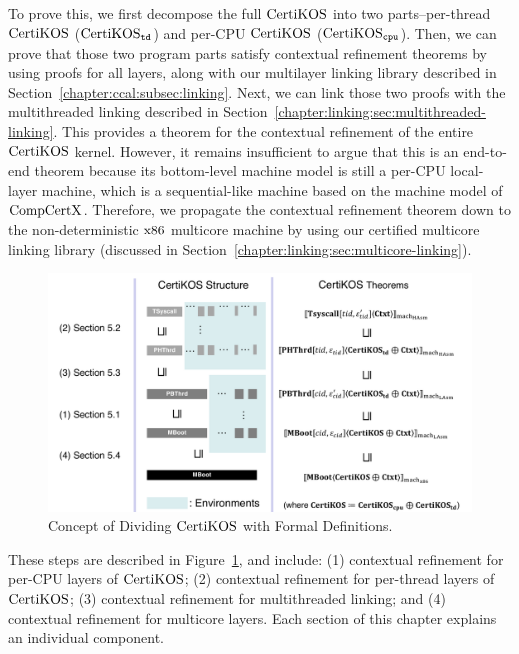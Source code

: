 To  prove this, we first decompose the full $\mathrm{CertiKOS}$ into two parts--per-thread $\mathrm{CertiKOS}$ ($\mathrm{CertiKOS}_{{\mathrm{\texttt{td}}}}$) and per-CPU $\mathrm{CertiKOS}$ ($\mathrm{CertiKOS}_{{\mathrm{\texttt{cpu}}}}$).
Then, we can prove that those two program parts satisfy contextual refinement theorems by using proofs for all layers,
along with our multilayer linking library described in Section~\ref{chapter:ccal:subsec:linking}. 
Next, we can link those two proofs with the multithreaded linking described in Section~\ref{chapter:linking:sec:multithreaded-linking}. 
This provides a theorem for the contextual refinement of the entire $\mathrm{CertiKOS}$ kernel. 
However, it remains insufficient to argue that this is an end-to-end theorem because its bottom-level machine model is still a per-CPU local-layer machine, which is a sequential-like machine based on the machine model of $\mathrm{CompCertX}$. 
Therefore, we propagate the contextual refinement theorem down to the non-deterministic $\mathrm{x86}$ multicore machine by using our certified multicore linking library (discussed in Section~\ref{chapter:linking:sec:multicore-linking}).
\begin{figure}
\includegraphics[width=\textwidth, page=1]{figs/certikos/concurrent_linking}
\caption{Concept of Dividing $\mathrm{CertiKOS}$ with Formal Definitions.} 
\label{fig:chapter:certikos:idea-of-dividing-certikos-with-formal-def}
\end{figure}
These steps are described in Figure~\ref{fig:chapter:certikos:idea-of-dividing-certikos-with-formal-def}, and include: 
(1) contextual refinement for per-CPU layers of $\mathrm{CertiKOS}$; 
(2) contextual refinement for per-thread layers of $\mathrm{CertiKOS}$; 
(3) contextual refinement for multithreaded linking; and 
(4) contextual refinement for multicore layers. Each section of this chapter explains an individual component.
